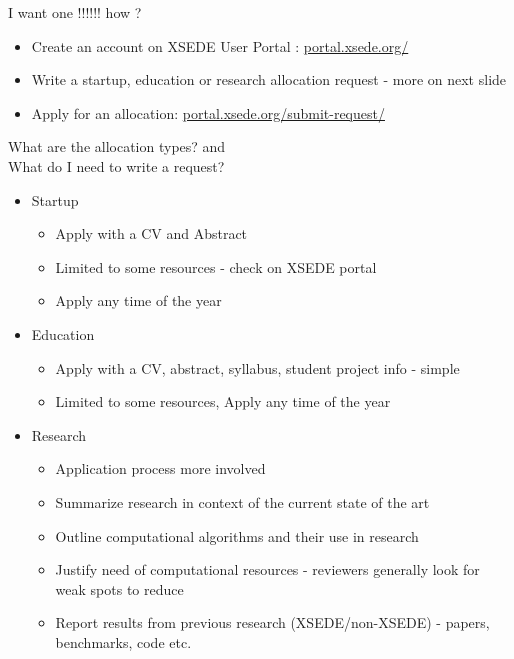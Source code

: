 \documentclass[compress,10pt]{beamer}
\begin{document}
\begin{frame}{I want one !!!!!! how ?}
\begin{itemize}
\pause
\item Create an account on XSEDE User Portal :  \url{portal.xsede.org/}
\pause
\item Write a startup, education or research allocation request - more on next slide
\pause
\item Apply for an allocation: \url{portal.xsede.org/submit-request/}
\end{itemize}
\end{frame}

\begin{frame}{What are the allocation types? and \\What do I need to write a request?}
\begin{itemize}
\pause
\item Startup 
\begin{itemize}
\pause
\item Apply with a CV and Abstract
\pause
\item Limited to some resources - check on XSEDE portal
\pause
\item Apply any time of the year

\end{itemize}
\pause
\item Education
\begin{itemize}
\pause
\item Apply with a CV, abstract, syllabus, student project info - simple
\pause
\item Limited to some resources, Apply any time of the year
\end{itemize}
\pause
\item Research
\begin{itemize}
\pause
\item Application process more involved
\pause
\item Summarize research in context of the current state of the art
\pause
\item Outline computational algorithms and their use in research
\pause
\item Justify need of computational resources - reviewers generally look for weak spots to reduce
\pause
\item Report results from previous research (XSEDE/non-XSEDE) - papers, benchmarks, code etc.
\end{itemize}
\end{itemize}
\end{frame}
\end{document}
